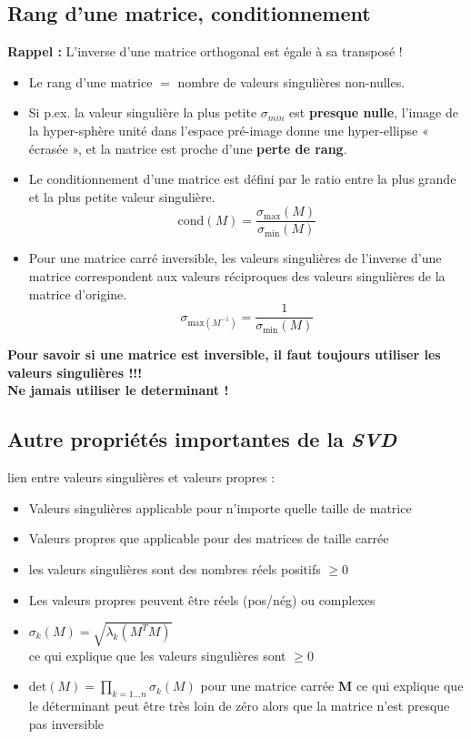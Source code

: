 \documentclass[document.tex]{subfiles}
\begin{document}
\subsection{Rang d'une matrice, conditionnement}

\textbf{Rappel : }L'inverse d'une matrice orthogonal est égale à sa transposé !

\begin{itemize}
\item  Le rang d'une matrice $=$ nombre de valeurs singulières non-nulles.
\item Si p.ex. la valeur singulière la plus petite $\sigma_{min}$ est \textbf{presque nulle}, l'image de
la hyper-sphère unité dans l'espace pré-image donne une hyper-ellipse « écrasée », et la matrice est proche d'une \textbf{perte de rang}.
\item  Le conditionnement d'une matrice est défini par le ratio entre la plus grande et la plus petite valeur singulière.
$$ \boxed{\text{cond}(M) = \dfrac{\sigma_{\text{max}}(M)}{\sigma_{\text{min}}(M)}} $$
\item Pour une matrice carré inversible, les valeurs singulières de l'inverse d'une matrice correspondent aux valeurs réciproques des valeurs singulières de la matrice d'origine.
$$ \boxed{\sigma_{\text{max}(M^{-1})}= \dfrac{1}{\sigma_{\text{min}}(M)}} $$
\end{itemize}


\textbf{Pour savoir si une matrice est inversible, il faut toujours utiliser les valeurs singulières !!! \\ Ne jamais utiliser le determinant !}

\subsection{Autre propriétés importantes de la \textit{SVD}}

lien entre valeurs singulières et valeurs propres :\\
\begin{itemize}
\item Valeurs singulières applicable pour n'importe quelle taille de matrice
\item Valeurs propres que applicable pour des matrices de taille carrée
\item les valeurs singulières sont des nombres réels positifs $\geq 0$
\item Les valeurs propres peuvent être réels (pos/nég) ou complexes
\item  $\boxed{\sigma_k(M)=\sqrt{\lambda_k(M^T M)}}$\\
ce qui explique que les valeurs singulières sont $\geq 0$
\item $\boxed{\text{det}(M) = \prod_{k=1 \ldots n}\sigma_k(M)}$ pour une matrice carrée \textbf{M} ce qui explique que le déterminant peut être très loin de zéro alors que
la matrice n'est presque pas inversible
\end{itemize}
\end{document}

